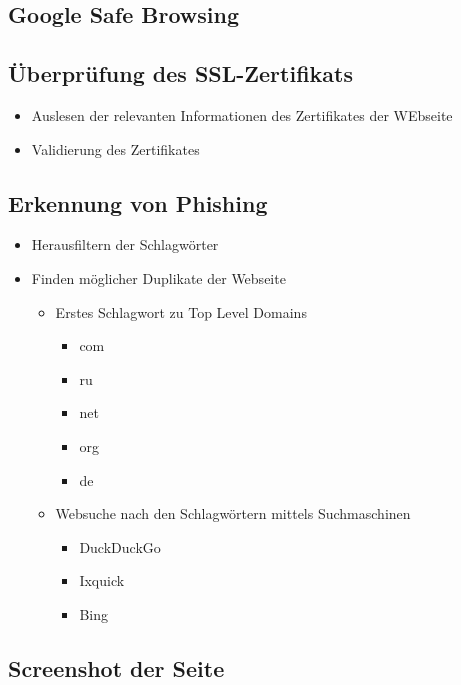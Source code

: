 \subsection{Google Safe Browsing}


\subsection{Überprüfung des SSL-Zertifikats}


\begin{itemize}
  \item Auslesen der relevanten Informationen des Zertifikates der WEbseite
  \item Validierung des Zertifikates
\end{itemize}

\subsection{Erkennung von Phishing}


\begin{itemize}
  \item Herausfiltern der Schlagwörter
  \item Finden möglicher Duplikate der Webseite
  \begin{itemize}
    \item Erstes Schlagwort zu Top Level Domains
    \begin{itemize}
      \item com
      \item ru
      \item net
      \item org
      \item de
    \end{itemize}
    \item Websuche nach den Schlagwörtern mittels Suchmaschinen
    \begin{itemize}
      \item DuckDuckGo
      \item Ixquick
      \item Bing
    \end{itemize}
  \end{itemize}
\end{itemize}

\subsection{Screenshot der Seite}

